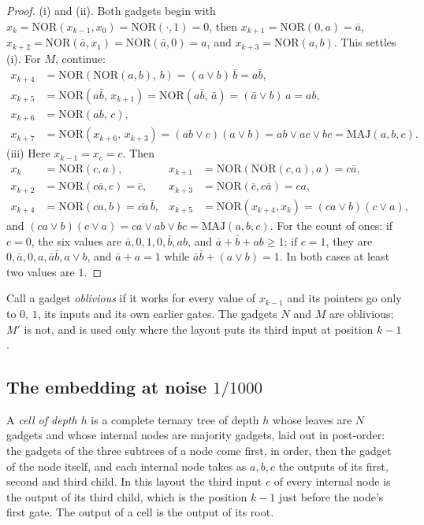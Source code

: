 \documentclass[11pt]{amsart}
\theoremstyle{definition}
\theoremstyle{remark}
\newcommand{\NOR}{\mathrm{NOR}}
\newcommand{\MAJ}{\mathrm{MAJ}}
\begin{document}
\begin{proof}
(i) and (ii). Both gadgets begin with $x_k=\NOR(x_{k-1},x_0)=\NOR(\cdot,1)=0$,
then $x_{k+1}=\NOR(0,a)=\bar a$, $x_{k+2}=\NOR(\bar a,x_1)=\NOR(\bar a,0)=a$,
and $x_{k+3}=\NOR(a,b)$. This settles (i). For $M$, continue:
\begin{align*}
x_{k+4}&=\NOR(\NOR(a,b),\,b)=(a\vee b)\,\bar b=a\bar b,\\
x_{k+5}&=\NOR(a\bar b,\,x_{k+1})=\NOR(a\bar b,\,\bar a)=(\bar a\vee b)\,a=ab,\\
x_{k+6}&=\NOR(ab,\,c),\\
x_{k+7}&=\NOR(x_{k+6},\,x_{k+3})=(ab\vee c)(a\vee b)=ab\vee ac\vee bc
=\MAJ(a,b,c).
\end{align*}
(iii) Here $x_{k-1}=x_c=c$. Then
\begin{align*}
x_k&=\NOR(c,a), & x_{k+1}&=\NOR(\NOR(c,a),a)=c\bar a,\\
x_{k+2}&=\NOR(c\bar a,c)=\bar c, & x_{k+3}&=\NOR(\bar c,c\bar a)=ca,\\
x_{k+4}&=\NOR(ca,b)=\overline{ca}\,\bar b, &
x_{k+5}&=\NOR(x_{k+4},x_k)=(ca\vee b)(c\vee a),
\end{align*}
and $(ca\vee b)(c\vee a)=ca\vee ab\vee bc=\MAJ(a,b,c)$. For the count of ones:
if $c=0$, the six values are $\bar a,0,1,0,\bar b,ab$, and
$\bar a+\bar b+ab\ge1$; if $c=1$, they are $0,\bar a,0,a,\bar a\bar b,a\vee
b$, and $\bar a+a=1$ while $\bar a\bar b+(a\vee b)=1$. In both cases at least
two values are $1$.
\end{proof}

Call a gadget \emph{oblivious} if it works for every value of $x_{k-1}$ and
its pointers go only to $0$, $1$, its inputs and its own earlier gates. The
gadgets $N$ and $M$ are oblivious; $M'$ is not, and is used only where the
layout puts its third input at position $k-1$.

\subsection{The embedding at noise \texorpdfstring{$1/1000$}{1/1000}}
\label{gb:sec-1000}

A \emph{cell of depth $h$} is a complete ternary tree of depth $h$ whose
leaves are $N$ gadgets and whose internal nodes are majority gadgets, laid
out in post-order: the gadgets of the three subtrees of a node come first,
in order, then the gadget of the node itself, and each internal node takes
as $a,b,c$ the outputs of its first, second and third child. In this layout
the third input $c$ of every internal node is the output of its third
child, which is the position $k-1$ just before the node's first gate. The
output of a cell is the output of its root.
\end{document}
